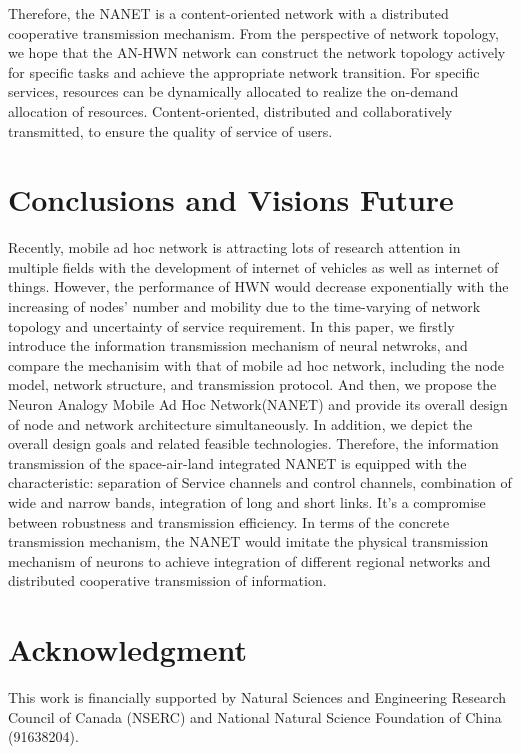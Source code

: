 \documentclass[journal,comsoc]{IEEEtran}
\begin{document}
				Therefore, the NANET is a content-oriented network with a distributed cooperative transmission mechanism.
				From the perspective of network topology, we hope that the AN-HWN network can construct the network topology actively for specific tasks and achieve the appropriate network transition.
				For specific services, resources can be dynamically allocated to realize the on-demand allocation of resources.
				Content-oriented, distributed and collaboratively transmitted, to ensure the quality of service of users.
				
	\section{Conclusions and Visions Future}
	\label{section: Conclusion}
		Recently, mobile ad hoc network is attracting lots of research attention in multiple fields with the development of internet of vehicles as well as internet of things. 
		However, the performance of HWN would decrease exponentially with the increasing of nodes' number and mobility due to the time-varying of network topology and uncertainty of service requirement. 
		In this paper, we firstly introduce the information transmission mechanism of neural netwroks, 
		and compare the mechanisim with that of mobile ad hoc network, 
		including the node model, network structure, and transmission protocol. 
		And then, we propose the Neuron Analogy Mobile Ad Hoc Network(NANET) and provide its overall design of node and network architecture simultaneously.
		In addition, we depict the overall design goals and related feasible technologies.
		Therefore, the information transmission of the space-air-land integrated NANET is equipped with the characteristic: separation of Service channels and control channels, combination of wide and narrow bands, integration of long and short links.
		It's a compromise between robustness and transmission efficiency.
	In terms of the concrete transmission mechanism, the NANET would imitate the physical transmission mechanism of neurons to achieve integration of different regional networks and distributed cooperative transmission of information.
	\appendices
	\section*{Acknowledgment}
	This work is financially supported by Natural Sciences and Engineering Research Council of Canada (NSERC) and National Natural Science Foundation of China (91638204).
	
	\nocite{*}
	
	
	\ifCLASSOPTIONcaptionsoff
	\newpage
	\fi
	
	
\end{document}

